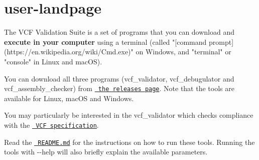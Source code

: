 \chapter{user-\/landpage}
\hypertarget{md_docs_2user-landpage}{}\label{md_docs_2user-landpage}
The VCF Validation Suite is a set of programs that you can download and {\bfseries{execute in your computer}} using a terminal (called "{}\mbox{[}command prompt\mbox{]}(https\+://en.\+wikipedia.\+org/wiki/\+Cmd.\+exe)"{} on Windows, and "{}terminal"{} or "{}console"{} in Linux and mac\+OS).

You can download all three programs ({\ttfamily vcf\+\_\+validator}, {\ttfamily vcf\+\_\+debugulator} and {\ttfamily vcf\+\_\+assembly\+\_\+checker}) from \href{https://github.com/EBIvariation/vcf-validator/releases}{\texttt{ the releases page}}. Note that the tools are available for Linux, mac\+OS and Windows.

You may particularly be interested in the {\ttfamily vcf\+\_\+validator} which checks compliance with the \href{https://samtools.github.io/hts-specs/VCFv4.3.pdf}{\texttt{ VCF specification}}.

Read the \href{https://github.com/EBIvariation/vcf-validator/blob/master/README.md\#run}{\texttt{ README.\+md}} for the instructions on how to run these tools. Running the tools with {\ttfamily -\/-\/help} will also briefly explain the available parameters. 